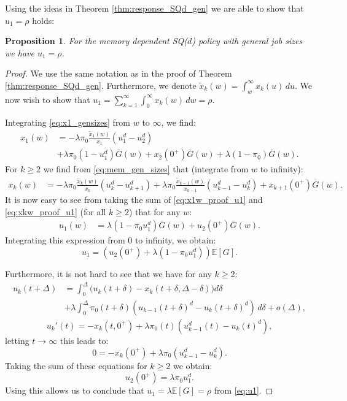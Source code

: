 \documentclass[12pt]{report}
\newcommand{\E}{\mathbb{E}}
\newtheorem{proposition}[theorem]{Proposition}
\begin{document}
Using the ideas in Theorem \ref{thm:response_SQd_gen} we are able to show that $u_1=\rho$ holds:
\begin{proposition} \label{prop:u1_eq_rho_SQd_gen}
For the memory dependent SQ($d$) policy with general job sizes we have $u_1 = \rho$.
\end{proposition}
\begin{proof}
We use the same notation as in the proof of Theorem \ref{thm:response_SQd_gen}. Furthermore, we denote $\tilde x_k(w) = \int_w^\infty x_k(u) \, du$. We now wish to show that $u_1 = \sum_{k=1}^\infty \int_0^\infty x_k(w) \, dw = \rho$.

Integrating \eqref{eq:x1_gensizes} from $w$ to $\infty$, we find:
\begin{align}
x_1(w) &= - \lambda \pi_0 \frac{\tilde x_1 (w)}{x_1} (u_1^d - u_2^d)\nonumber\\
& + \lambda \pi_0 (1-u_1^d) \bar G(w) + x_2(0^+) \bar G(w) + \lambda (1-\pi_0) \bar G(w). \label{eq:x1w_proof_u1}
\end{align}
For $k \geq 2$ we find from \eqref{eq:mem_gen_sizes} that (integrate from $w$ to infinity):
\begin{align}
x_k(w)
&= - \lambda \pi_0 \frac{\tilde x_k(w)}{x_k} (u_k^d - u_{k+1}^d) + \lambda \pi_0 \frac{\tilde x_{k-1}(w)}{x_{k-1}} (u_{k-1}^d - u_k^d) + x_{k+1}(0^+) \bar G(w). \label{eq:xkw_proof_u1}
\end{align}
It is now easy to see from taking the sum of \eqref{eq:x1w_proof_u1} and \eqref{eq:xkw_proof_u1} (for all $k\geq 2$) that for any $w$:
\begin{align}
u_1(w) &= \lambda (1-\pi_0 u_1^d) \bar G(w) + u_2(0^+) \bar G(w). \label{eq:u1w}
\end{align}
Integrating this expression from $0$ to infinity, we obtain:
\begin{equation}\label{eq:u1}
u_1 = \left( u_2(0^+) + \lambda (1-\pi_0 u_1^d) \right) \E[G].
\end{equation}

Furthermore, it is not hard to see that we have for any $k \geq 2$:
\begin{align*}
u_k(t+\Delta) &= \int_0^\Delta \big( u_k(t+\delta) - x_k(t+\delta, \Delta - \delta) \big) d\delta  \\
&+ \lambda \int_0^\Delta \pi_0(t+\delta) \left(u_{k-1}(t+\delta)^d - u_k(t+\delta)^d \right) \, d\delta + o(\Delta),
\end{align*}
$$
u_k'(t) = -x_k(t,0^+) + \lambda \pi_0(t) (u_{k-1}^d(t)- u_k(t)^d),
$$
letting $t\rightarrow \infty$ this leads to:
$$
0 = - x_k(0^+) + \lambda \pi_0 (u_{k-1} ^ d - u_k^d).
$$
Taking the sum of these equations for $k \geq 2$ we obtain:
$$
u_2(0^+) = \lambda \pi_0 u_1^d.
$$
Using this allows us to conclude that $u_1 = \lambda \E[G] = \rho$ from \eqref{eq:u1}.
\end{proof}
\end{document}
